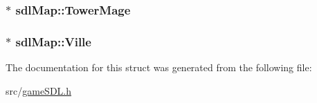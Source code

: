 \hypertarget{structsdl_map_aedc2a06f1f47c80edc6b7510830202d6}{
\subsubsection[{Tower\-Mage}]{$\ast$ sdl\-Map\-::\-Tower\-Mage}}\label{structsdl_map_aedc2a06f1f47c80edc6b7510830202d6}
\hypertarget{structsdl_map_a45977cb3436f7ede49da5446f19e7919}{
\subsubsection[{Ville}]{$\ast$ sdl\-Map\-::\-Ville}}\label{structsdl_map_a45977cb3436f7ede49da5446f19e7919}


The documentation for this struct was generated from the following file\-:\begin{DoxyCompactItemize}
\item 
src/\hyperlink{game_s_d_l_8h}{game\-S\-D\-L.\-h}\end{DoxyCompactItemize}

